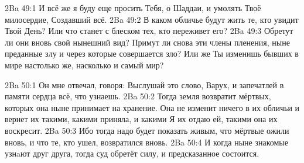 \vs 2Ba 49:1
И всё же я буду еще просить Тебя, о Шаддаи, и умолять Твоё милосердие, Создавший всё.
\vs 2Ba 49:2
В каком обличье будут жить те, кто увидит Твой День? Или что станет с блеском тех, кто переживет его?
\vs 2Ba 49:3
Обретут ли они вновь свой нынешний вид? Примут ли снова эти члены пленения, ныне преданные злу и через которые совершается зло? Или же Ты изменишь бывших в мире настолько же, насколько и самый мир?

\vs 2Ba 50:1
Он мне отвечал, говоря: Выслушай это слово, Варух, и запечатлей в памяти сердца всё, что узнаешь.
\vs 2Ba 50:2
Тогда земля возвратит мёртвых, которых она ныне принимает на хранение. Она не изменит ничего в их обличьи и вернет их такими, какими приняла, и какими Я их отдаю ей, такими она их воскресит.
\vs 2Ba 50:3
Ибо тогда надо будет показать живым, что мёртвые ожили вновь, и что те, кто ушел, возвратился вновь.
\vs 2Ba 50:4
И когда ныне знакомые узнaют друг друга, тогда суд обретёт силу, и предсказанное состоится.

